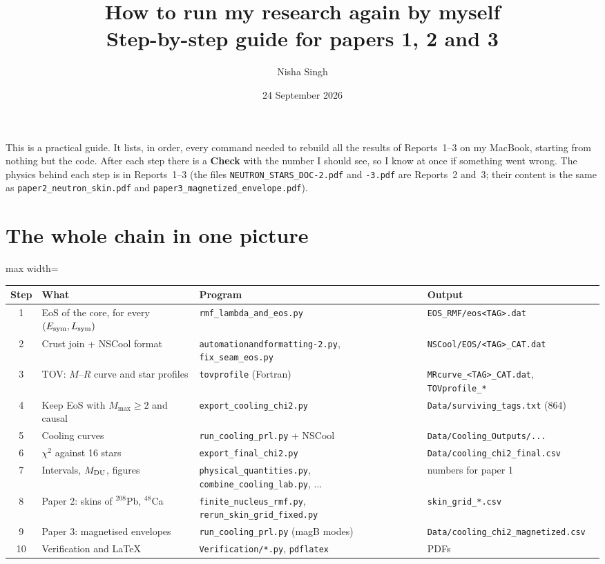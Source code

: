 \documentclass[11pt,a4paper]{article}
\title{How to run my research again by myself\\[2mm]\large Step-by-step guide for papers 1, 2 and 3}
\author{Nisha Singh}
\date{24 September 2026}
\newcommand{\Esym}{E_{\rm sym}}
\newcommand{\Lsym}{L_{\rm sym}}
\newcommand{\f}[1]{\texttt{#1}}
\begin{document}
\sloppy
\maketitle

\noindent This is a practical guide. It lists, in order, every command needed to rebuild all the results of Reports~1--3 on my MacBook, starting from nothing but the code. After each step there is a \textcolor{okc}{\textbf{Check}} with the number I should see, so I know at once if something went wrong. The physics behind each step is in Reports~1--3 (the files \f{NEUTRON\_STARS\_DOC-2.pdf} and \f{-3.pdf} are Reports~2 and~3; their content is the same as \f{paper2\_neutron\_skin.pdf} and \f{paper3\_magnetized\_envelope.pdf}).

\tableofcontents

\section{The whole chain in one picture}

\begin{center}
\begin{adjustbox}{max width=\linewidth}
\begin{tabular}{clll}
\toprule
Step & What & Program & Output\\
\midrule
1 & EoS of the core, for every $(\Esym,\Lsym)$ & \f{rmf\_lambda\_and\_eos.py} & \f{EOS\_RMF/eos<TAG>.dat}\\
2 & Crust join + NSCool format & \f{automationandformatting-2.py}, \f{fix\_seam\_eos.py} & \f{NSCool/EOS/<TAG>\_CAT.dat}\\
3 & TOV: $M$--$R$ curve and star profiles & \f{tovprofile} (Fortran) & \f{MRcurve\_<TAG>\_CAT.dat}, \f{TOVprofile\_*}\\
4 & Keep EoS with $M_{\max}\ge2$ and causal & \f{export\_cooling\_chi2.py} & \f{Data/surviving\_tags.txt} (864)\\
5 & Cooling curves & \f{run\_cooling\_prl.py} + NSCool & \f{Data/Cooling\_Outputs/...}\\
6 & $\chi^2$ against 16 stars & \f{export\_final\_chi2.py} & \f{Data/cooling\_chi2\_final.csv}\\
7 & Intervals, $M_{\rm DU}$, figures & \f{physical\_quantities.py}, \f{combine\_cooling\_lab.py}, ... & numbers for paper 1\\
8 & Paper 2: skins of $^{208}$Pb, $^{48}$Ca & \f{finite\_nucleus\_rmf.py}, \f{rerun\_skin\_grid\_fixed.py} & \f{skin\_grid\_*.csv}\\
9 & Paper 3: magnetised envelopes & \f{run\_cooling\_prl.py} (magB modes) & \f{Data/cooling\_chi2\_magnetized.csv}\\
10 & Verification and LaTeX & \f{Verification/*.py}, \f{pdflatex} & PDFs\\
\bottomrule
\end{tabular}
\end{adjustbox}
\end{center}
\end{document}
